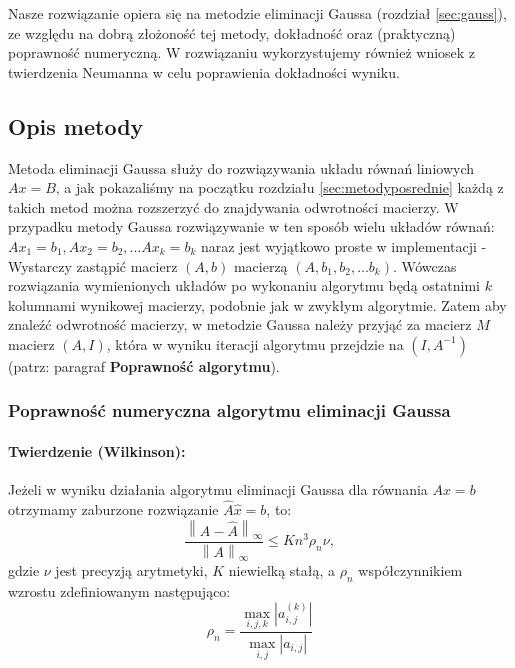 \documentclass{article}
\newcommand{\norm}[1]{\left\lVert#1\right\rVert}
\begin{document}
Nasze rozwiązanie opiera się na metodzie eliminacji Gaussa (rozdział \ref{sec:gauss}), ze względu na dobrą złożoność tej metody, dokładność oraz (praktyczną) poprawność numeryczną. W rozwiązaniu wykorzystujemy również wniosek z twierdzenia Neumanna w celu poprawienia dokładności wyniku.

\subsection{Opis metody}

Metoda eliminacji Gaussa służy do rozwiązywania układu równań liniowych $Ax = B$, a jak pokazaliśmy na początku rozdziału \ref{sec:metodyposrednie} każdą z takich metod można rozszerzyć do znajdywania odwrotności macierzy. W przypadku metody Gaussa rozwiązywanie w ten sposób wielu układów równań: $Ax_1 = b_1, Ax_2 = b_2, \dots Ax_k=b_k$ naraz jest wyjątkowo proste w implementacji - Wystarczy zastąpić macierz $(A, b)$ macierzą $(A, b_1, b_2, \dots b_k)$. Wówczas rozwiązania wymienionych układów po wykonaniu algorytmu będą ostatnimi $k$ kolumnami wynikowej macierzy, podobnie jak w zwykłym algorytmie. Zatem aby znaleźć odwrotność macierzy, w metodzie Gaussa należy przyjąć za macierz $M$ macierz $(A, I)$, która w wyniku iteracji algorytmu przejdzie na $(I, A^{-1})$ (patrz: paragraf \textbf{Poprawność algorytmu}). \\

\subsubsection{Poprawność numeryczna algorytmu eliminacji Gaussa}

\paragraph{Twierdzenie (Wilkinson):} Jeżeli w wyniku działania algorytmu eliminacji Gaussa dla równania $Ax = b$ otrzymamy zaburzone rozwiązanie $\widehat{A}\hat{x}=b$, to:
\begin{equation}
\frac{\norm{A - \widehat{A}}_{\infty}}{\norm{A}_{\infty}} \leq K n^3 \rho_n \nu,
\end{equation}
gdzie $\nu$ jest precyzją arytmetyki, $K$ niewielką stałą, a $\rho_n$ współczynnikiem wzrostu zdefiniowanym następująco:
\begin{equation}
\rho_n = \frac{\max\limits_{i, j, k} |a^{(k)}_{i, j}|}{\max\limits_{i, j}|a_{i, j}|}
\end{equation}
\end{document}
